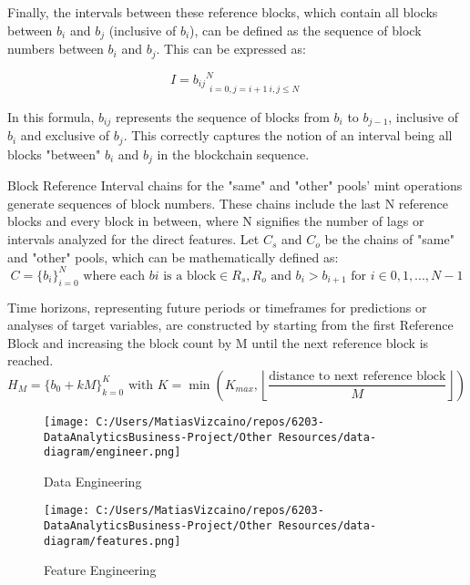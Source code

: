 \documentclass{article}
\begin{document}
{Finally, the intervals between these reference blocks, which contain all blocks between $b_i$ and $b_j$ (inclusive of $b_i$), can be defined as the sequence of block numbers between $b_i$ and $b_j$. This can be expressed as:

\begin{equation}
I = {b_{ij}}_{\substack{i=0,j=i+1 \ i,j\leq N}}^N
\end{equation}

In this formula, $b_{ij}$ represents the sequence of blocks from $b_i$ to $b_{j-1}$, inclusive of $b_i$ and exclusive of $b_j$. This correctly captures the notion of an interval being all blocks "between" $b_i$ and $b_j$ in the blockchain sequence.


Block Reference Interval chains for the "same" and "other" pools' mint operations generate sequences of block numbers. These chains include the last N reference blocks and every block in between, where N signifies the number of lags or intervals analyzed for the direct features. Let $C_{s}$ and $C_{o}$ be the chains of "same" and "other" pools, which can be mathematically defined as:
\begin{equation}
  C = \{b_{i}\}_{i=0}^{N} \text{ where each } b{i} \text{ is a block} \in {R_s, R_o} \text{ and } b_{i} > b_{i+1} \text{ for } i \in {0,1,...,N-1}
  \end{equation}

Time horizons, representing future periods or timeframes for predictions or analyses of target variables, are constructed by starting from the first Reference Block and increasing the block count by M until the next reference block is reached. 
\begin{equation}
  H_{M} = \{b_{0}+kM\}_{k=0}^{K} \text{ with } K = \min \left( K_{max}, \left\lfloor \frac{\text{distance to next reference block}}{M} \right\rfloor \right)
  \end{equation}

  \begin{figure}[htbp]
    \begin{minipage}{0.5\textwidth}
      \centering
      \texttt{[image: C:/Users/MatiasVizcaino/repos/6203-DataAnalyticsBusiness-Project/Other Resources/data-diagram/engineer.png]}
      \caption{Data Engineering}
      \label{fig:data-diagram-engineer}
    \end{minipage}
    \begin{minipage}{0.45\textwidth}
      \centering
      \texttt{[image: C:/Users/MatiasVizcaino/repos/6203-DataAnalyticsBusiness-Project/Other Resources/data-diagram/features.png]}
      \caption{Feature Engineering}
      \label{fig:data-diagram-features}
    \end{minipage}
  \end{figure}

}
\end{document}
